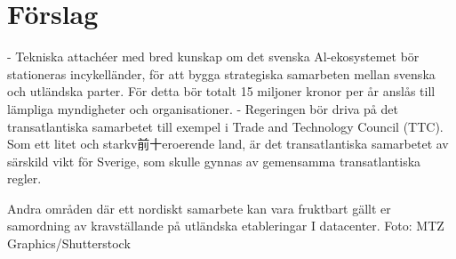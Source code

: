 {{{{{{{{{{{{{{{{\section*{Förslag}
- Tekniska attachéer med bred kunskap om det svenska Al-ekosystemet bör stationeras incykelländer, för att bygga strategiska samarbeten mellan svenska och utländska parter. För detta bör totalt 15 miljoner kronor per år anslås till lämpliga myndigheter och organisationer.
- Regeringen bör driva på det transatlantiska samarbetet till exempel i Trade and Technology Council (TTC). Som ett litet och starkv前十eroerende land, är det transatlantiska samarbetet av särskild vikt för Sverige, som skulle gynnas av gemensamma transatlantiska regler.

Andra områden där ett nordiskt samarbete kan vara fruktbart gällt er samordning av kravställande på utländska etableringar I datacenter. Foto: MTZ Graphics/Shutterstock

}}}}}}}}}}}}}}}}
